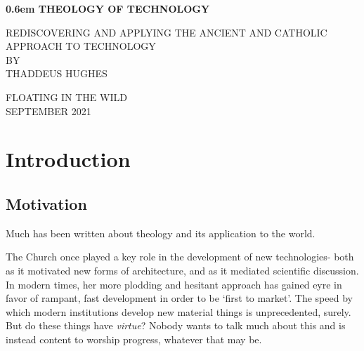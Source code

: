 \documentclass[letterpaper]{article}
\begin{document}
\clearpage
\newcommand\nbvspace[1][3]{\vspace*{\stretch{#1}}}
\newcommand\nbstretchyspace{\spaceskip0.5em plus 0.25em minus 0.25em}
\newcommand{\nbtitlestretch}{\spaceskip0.6em}
\pagestyle{plain}
\begin{center}
  \bfseries
  \nbvspace[1]
  \Huge
  {\nbtitlestretch\huge
    THEOLOGY OF TECHNOLOGY}

  \nbvspace[1]
  \normalsize
  REDISCOVERING AND APPLYING THE ANCIENT AND CATHOLIC APPROACH TO TECHNOLOGY\\

  \nbvspace[1]
  \small BY\\
  \Large THADDEUS HUGHES\\

  \nbvspace[2]

  \nbvspace[3]
  \normalsize

  \large
  FLOATING IN THE WILD \\
  \small SEPTEMBER 2021 \\
\end{center}

\raggedbottom
\tableofcontents

\newpage

\section{Introduction}

\subsection{Motivation}
Much has been written about theology and its application to the world. 

The Church once played a key role in the development of new technologies- both as it motivated new forms of architecture, and as it mediated scientific discussion. In modern times, her more plodding and hesitant approach has gained eyre in favor of rampant, fast development in order to be `first to market'. The speed by which modern institutions develop new material things is unprecedented, surely. But do these things have \textit{virtue}? Nobody wants to talk much about this and is instead content to worship progress, whatever that may be.
\end{document}

